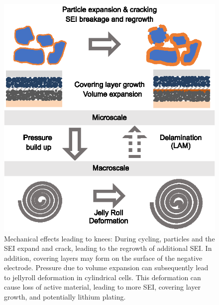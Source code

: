 \documentclass[journal=jpclcd,manuscript=article]{achemso}
\begin{document}
\begin{figure}
\centering
\includegraphics[scale = 1]{figures/mechanical.eps}
\caption{Mechanical effects leading to knees: During cycling, particles and the SEI expand and crack, leading to the regrowth of additional SEI. In addition, covering layers may form on the surface of the negative electrode. Pressure due to volume expansion can subsequently lead to jellyroll deformation in cylindrical cells. This deformation can cause loss of active material, leading to more SEI, covering layer growth, and potentially lithium plating.}
\label{fig:knee_mechanical}
\end{figure}
\end{document}
